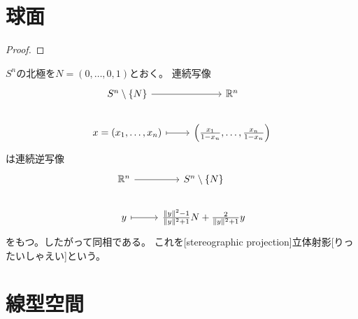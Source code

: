 \documentclass[report]{jlreq}
\begin{document}
\section{球面}

\begin{definition}
    \TODO{}
\end{definition}


\begin{proof}
    \TODO{}
\end{proof}

\begin{definition}[立体射影]
    $S^n$の北極を$N = (0, \dots, 0, 1)$とおく。
    連続写像
    \begin{equation}
        \begin{tikzcd}
            S^n \setminus \{ N \}
                \ar{r}
                & \R^n \\
            x = (x_1, \dots, x_n)
                \ar[mapsto]{r}
                & \left( \frac{x_1}{1-x_n}, \dots, \frac{x_n}{1-x_n} \right)
        \end{tikzcd}
    \end{equation}
    は連続逆写像
    \begin{equation}
        \begin{tikzcd}
            \R^n
                \ar{r}
                & S^n \setminus \{ N \} \\
            y
                \ar[mapsto]{r}
                & \frac{\|y\|^2 - 1}{\|y\|^2 + 1} N + \frac{2}{\|y\|^2 + 1} y
        \end{tikzcd}
    \end{equation}
    をもつ。したがって同相である。
    これを[stereographic projection]{立体射影}[りったいしゃえい]という。
\end{definition}

%
\section{線型空間}

\end{document}
